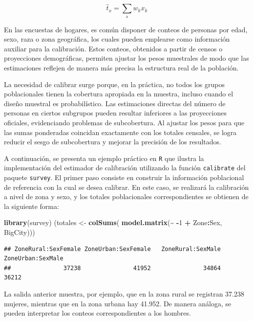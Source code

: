 \documentclass[
  spanish,
  12pt,
]{book}
\newenvironment{Shaded}{\begin{snugshade}}{\end{snugshade}}
\newcommand{\DecValTok}[1]{\textcolor[rgb]{0.00,0.00,0.81}{#1}}
\newcommand{\FunctionTok}[1]{\textcolor[rgb]{0.13,0.29,0.53}{\textbf{#1}}}
\newcommand{\NormalTok}[1]{#1}
\newcommand{\OtherTok}[1]{\textcolor[rgb]{0.56,0.35,0.01}{#1}}
\newcommand{\SpecialCharTok}[1]{\textcolor[rgb]{0.81,0.36,0.00}{\textbf{#1}}}
\begin{document}
\[\hat{t}_x = \sum_s w_kx_k\]

En las encuestas de hogares, es común disponer de conteos de personas por edad, sexo, raza o zona geográfica, los cuales pueden emplearse como información auxiliar para la calibración. Estos conteos, obtenidos a partir de censos o proyecciones demográficas, permiten ajustar los pesos muestrales de modo que las estimaciones reflejen de manera más precisa la estructura real de la población.

La necesidad de calibrar surge porque, en la práctica, no todos los grupos poblacionales tienen la cobertura apropiada en la muestra, incluso cuando el diseño muestral es probabilístico. Las estimaciones directas del número de personas en ciertos subgrupos pueden resultar inferiores a las proyecciones oficiales, evidenciando problemas de subcobertura. Al ajustar los pesos para que las sumas ponderadas coincidan exactamente con los totales censales, se logra reducir el sesgo de subcobertura y mejorar la precisión de los resultados.

A continuación, se presenta un ejemplo práctico en \texttt{R} que ilustra la implementación del estimador de calibración utilizando la función \texttt{calibrate} del paquete \texttt{survey}. El primer paso consiste en construir la información poblacional de referencia con la cual se desea calibrar. En este caso, se realizará la calibración a nivel de zona y sexo, y los totales poblacionales correspondientes se obtienen de la siguiente forma:

\begin{Shaded}
\begin{Highlighting}[]
\FunctionTok{library}\NormalTok{(survey)}
\NormalTok{(totales }\OtherTok{\textless{}{-}} \FunctionTok{colSums}\NormalTok{(}
  \FunctionTok{model.matrix}\NormalTok{(}\SpecialCharTok{\textasciitilde{}} \SpecialCharTok{{-}}\DecValTok{1} \SpecialCharTok{+}\NormalTok{ Zone}\SpecialCharTok{:}\NormalTok{Sex, BigCity))) }
\end{Highlighting}
\end{Shaded}

\begin{verbatim}
## ZoneRural:SexFemale ZoneUrban:SexFemale   ZoneRural:SexMale   ZoneUrban:SexMale 
##               37238               41952               34864               36212
\end{verbatim}

La salida anterior muestra, por ejemplo, que en la zona rural se registran 37.238 mujeres, mientras que en la zona urbana hay 41.952. De manera análoga, se pueden interpretar los conteos correspondientes a los hombres.
\end{document}
